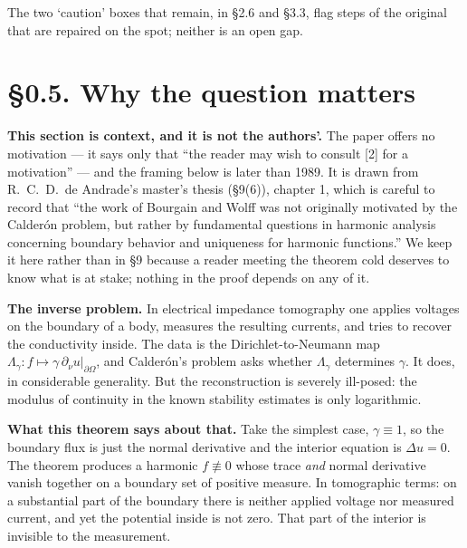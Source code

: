 \documentclass[11pt,reqno]{amsart}
\theoremstyle{plain}
\theoremstyle{definition}
\theoremstyle{plain}
\theoremstyle{definition}
\theoremstyle{remark}
\begin{document}
The two `caution' boxes that remain, in \S2.6 and \S3.3, flag steps of the original
that are repaired on the spot; neither is an open gap.

\section*{\S0.5. Why the question matters}

\begin{ournotation}
\textbf{This section is context, and it is not the authors'.} The paper offers no
motivation --- it says only that ``the reader may wish to consult [2] for a
motivation'' --- and the framing below is later than 1989. It is drawn from
R.~C.~D.~de Andrade's master's thesis (\S9(6)), chapter 1, which is careful to record
that ``the work of Bourgain and Wolff was not originally motivated by the Calder\'on
problem, but rather by fundamental questions in harmonic analysis concerning boundary
behavior and uniqueness for harmonic functions.'' We keep it here rather than in \S9
because a reader meeting the theorem cold deserves to know what is at stake; nothing
in the proof depends on any of it.
\end{ournotation}

\noindent\textbf{The inverse problem.} In electrical impedance tomography one applies
voltages on the boundary of a body, measures the resulting currents, and tries to
recover the conductivity inside. The data is the Dirichlet-to-Neumann map
$\Lambda_\gamma: f\mapsto\gamma\,\partial_\nu u|_{\partial\Omega}$, and Calder\'on's
problem asks whether $\Lambda_\gamma$ determines $\gamma$. It does, in considerable
generality. But the reconstruction is severely ill-posed: the modulus of continuity in
the known stability estimates is only logarithmic.

\medskip
\noindent\textbf{What this theorem says about that.} Take the simplest case,
$\gamma\equiv1$, so the boundary flux is just the normal derivative and the interior
equation is $\Delta u=0$. The theorem produces a harmonic $f\not\equiv0$ whose trace
\emph{and} normal derivative vanish together on a boundary set of positive measure. In
tomographic terms: on a substantial part of the boundary there is neither applied
voltage nor measured current, and yet the potential inside is not zero. That part of
the interior is invisible to the measurement.
\end{document}
